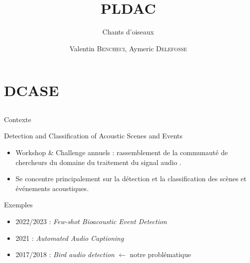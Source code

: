 \documentclass[compress,xcolor=table]{beamer}
\title{PLDAC}
\subtitle{Chants d'oiseaux} %
\date{\formatdate{25}{05}{2023}}
\author{Valentin \textsc{Bencheci}, Aymeric \textsc{Delefosse}}
\institute{Master DAC - Sorbonne Université} %
\begin{document}
\begin{frame}[plain]
    \titlepage
    \setcounter{framenumber}{0}
\end{frame}


\section{DCASE} \subsection{}

\begin{frame}{Contexte}

    \begin{block}{Detection and Classification of Acoustic Scenes and Events}

        \begin{itemize}
            \item
                  Workshop \& Challenge annuels : rassemblement de la communauté de chercheurs du domaine du traitement du signal audio .
            \item
                  Se concentre principalement sur la détection et la classification des scènes et événements acoustiques.
        \end{itemize}

    \end{block}

    \begin{exampleblock}{Exemples}
        \begin{itemize}
            \item
                  2022/2023 : \textit{Few-shot Bioacoustic Event Detection}
            \item
                  2021 : \textit{Automated Audio Captioning}
            \item
                  2017/2018 : \textit{Bird audio detection} $\leftarrow$ notre problématique
        \end{itemize}
    \end{exampleblock}

\end{frame}
\end{document}
